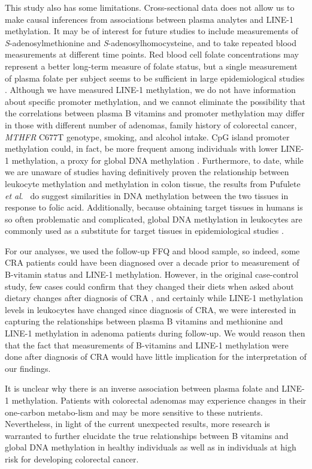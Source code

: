 \noindent This study also has some limitations. Cross-sectional data does not allow us to make causal inferences from associations between plasma analytes and LINE-1 methylation. It may be of interest for future studies to include measurements of \emph{S}-adenosylmethionine and \emph{S}-adenosylhomocysteine, and to take repeated blood measurements at different time points. Red blood cell folate concentrations may represent a better long-term measure of folate status, but a single measurement of plasma folate per subject seems to be sufficient in large epidemiological studies \cite{c560}. Although we have measured LINE-1 methylation, we do not have information about specific promoter methylation, and we cannot eliminate the possibility that the correlations between plasma B vitamins and promoter methylation may differ in those with different number of adenomas, family history of colorectal cancer, \emph{MTHFR} C677T genotype, smoking, and alcohol intake. CpG island promoter methylation could, in fact, be more frequent among individuals with lower LINE-1 methylation, a proxy for global DNA methylation \cite{c561}. Furthermore, to date, while we are unaware of studies having definitively proven the relationship between leukocyte methylation and methylation in colon tissue, the results from Pufulete \emph{et al}.~\cite{c552} do suggest similarities in DNA methylation between the two tissues in response to folic acid. Additionally, because obtaining target tissues in humans is so often problematic and complicated, global DNA methylation in leukocytes are commonly used as a substitute for target tissues in epidemiological studies  \cite{c57,c58,c59,c510}.

\noindent For our analyses, we used the follow-up FFQ and blood sample, so indeed, some CRA patients could have been diagnosed over a decade prior to measurement of B-vitamin status and LINE-1 methylation. However, in the original case-control study, few cases could confirm that they changed their diets when asked about dietary changes after diagnosis of CRA \cite{c562}, and certainly while LINE-1 methylation levels in leukocytes have changed since diagnosis of CRA, we were interested in capturing the relationships between plasma B vitamins and methionine and LINE-1 methylation in adenoma patients during follow-up. We would reason then that the fact that measurements of B-vitamins and LINE-1 methylation were done after diagnosis of CRA would have little implication for the interpretation of our findings.

\noindent It is unclear why there is an inverse association between plasma folate and LINE-1 methylation. Patients with colorectal adenomas may experience changes in their one-carbon metabo-lism and may be more sensitive to these nutrients. Nevertheless, in light of the current unexpected results, more research is warranted to further elucidate the true relationships between B vitamins and global DNA methylation in healthy individuals as well as in individuals at high risk for developing colorectal cancer.

